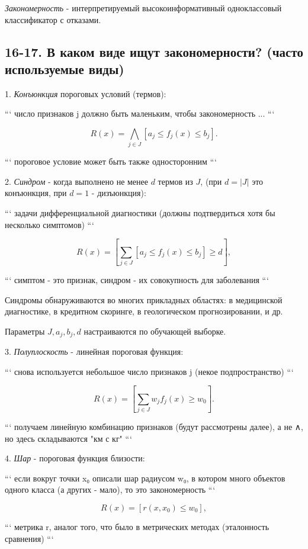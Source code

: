 \textit{Закономерность} - интерпретируемый высокоинформативный одноклассовый
классификатор с отказами.

\subsection{16-17. В каком виде ищут закономерности? (часто используемые виды)}

1. \textit{Конъюнкция} пороговых условий (термов):

```
число признаков j должно быть маленьким, чтобы закономерность ...
```

$$R{(x)} = \bigwedge_{j \in J}{\left[ a_j \leqslant f_j{(x)} \leqslant b_j \right].} $$

```
пороговое условие может быть также односторонним
```

2. \textit{Синдром} - когда выполнено не менее $d$ термов из $J$, (при $d = |J|$
это конъюнкция, при $d = 1$ - дизъюнкция):

```
задачи дифференциальной диагностики (должны подтвердиться хотя бы несколько
симптомов)
```

$$R{(x)} = {\left[ \sum_{j \in J}{\left[ a_j \leqslant f_j{(x)} \leqslant b_j \right]} \geqslant d \right]},$$

```
симптом - это признак, синдром - их совокупность для заболевания
```

Синдромы обнаруживаются во многих прикладных областях: в медицинской
диагностике, в кредитном скоринге, в геологическом прогнозировании, и др.

Параметры $J, a_j, b_j, d$ настраиваются по обучающей выборке.

3. \textit{Полуплоскость} - линейная пороговая функция:

```
снова используется небольшое число признаков j (некое подпространство)
```

$$R{(x)} = {\left[ \sum_{j \in J}{w_j f_j{(x)}} \geqslant w_0 \right]}.$$

```
получаем линейную комбинацию признаков (будут рассмотрены далее), а не ∧,
но здесь складываются "км с кг" 
```

4. \textit{Шар} - пороговая функция близости:

```
если вокруг точки x₀ описали шар радиусом w₀, в котором много объектов
одного класса (а других - мало), то это закономерность
```

$$R{(x)} = {\left[ r{(x, x_0)} \leqslant w_0 \right]},$$

```
метрика r, аналог того, что было в метрических методах (эталонность
сравнения)
```

